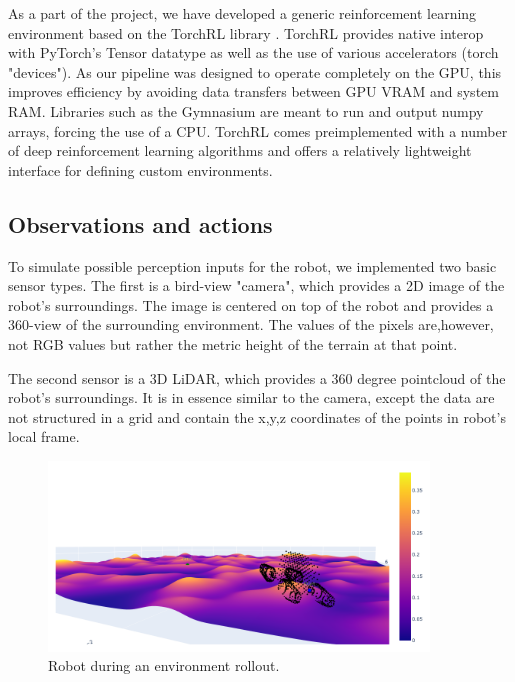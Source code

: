 \documentclass[a4paper,12pt]{article}
\begin{document}
As a part of the project, we have developed a generic reinforcement learning environment based on the TorchRL library \citep{bou2023torchrldatadrivendecisionmakinglibrary}. TorchRL provides native interop with PyTorch's Tensor datatype as well as the use of various accelerators (torch "devices"). As our pipeline was designed to operate completely on the GPU, this improves efficiency by avoiding data transfers between GPU VRAM and system RAM. Libraries such as the Gymnasium \citep{towers2024gymnasiumstandardinterfacereinforcement} are meant to run and output numpy arrays, forcing the use of a CPU. TorchRL comes preimplemented with a number of deep reinforcement learning algorithms and offers a relatively lightweight interface for defining custom environments.

\subsection{Observations and actions}
To simulate possible perception inputs for the robot, we implemented two basic sensor types. The first is a bird-view "camera", which provides a 2D image of the robot's surroundings. The image is centered on top of the robot and provides a 360-view of the surrounding environment. The values of the pixels are,however, not RGB values but rather the metric height of the terrain at that point. 

The second sensor is a 3D LiDAR, which provides a 360 degree pointcloud of the robot's surroundings. It is in essence similar to the camera, except the data are not structured in a grid and contain the x,y,z coordinates of the points in robot's local frame.

\begin{figure}[H]
  \centering
  \includegraphics[width=0.9\textwidth]{fig/robot_on_terrain.png}
  \caption{Robot during an environment rollout.}
\end{figure}
\end{document}
